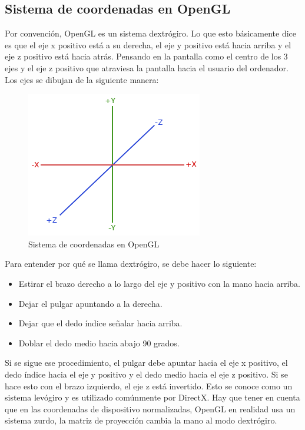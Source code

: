 \documentclass[a4paper, 17pt]{book}
\begin{document}
\subsection{Sistema de coordenadas en OpenGL} 
\label{subsec:SysOpenGL}

Por convención, OpenGL es un sistema dextrógiro. Lo que esto básicamente dice es que el eje x positivo está a su derecha, el eje y
positivo está hacia arriba y el eje z positivo está hacia atrás. Pensando en la pantalla como el centro de los 3 ejes y el eje z positivo
que atraviesa la pantalla hacia el usuario del ordenador. Los ejes se dibujan de la siguiente manera:

\begin{figure}[H]
    \centering
    \includegraphics[scale=0.40, keepaspectratio]{img/coordinate_systems_right_handed.png}
    \caption{Sistema de coordenadas en OpenGL}
    \label{figura:khronos}
\end{figure}

Para entender por qué se llama dextrógiro, se debe hacer lo siguiente:

\begin{itemize}
  \item Estirar el brazo derecho a lo largo del eje y positivo con la mano hacia arriba.
  \item Dejar el pulgar apuntando a la derecha.
  \item Dejar que el dedo índice señalar hacia arriba.
  \item Doblar el dedo medio hacia abajo 90 grados.
\end{itemize}

Si se sigue ese procedimiento, el pulgar debe apuntar hacia el eje x positivo, el dedo índice hacia 
el eje y positivo y el dedo medio hacia el eje z positivo. Si se hace esto con el brazo izquierdo,
el eje z está invertido. Esto se conoce como un sistema levógiro y es utilizado comúnmente por DirectX.
Hay que tener en cuenta que en las coordenadas de dispositivo normalizadas, OpenGL en realidad usa un
sistema zurdo, la matriz de proyección cambia la mano al modo dextrógiro.
\end{document}
